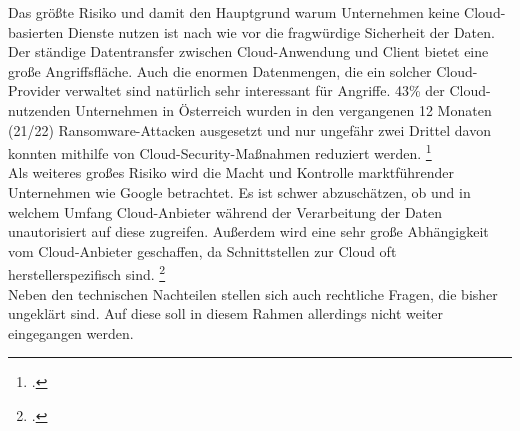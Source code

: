 Das größte Risiko und damit den Hauptgrund warum Unternehmen keine Cloud-basierten Dienste nutzen ist nach wie vor die fragwürdige Sicherheit der Daten. Der ständige Datentransfer zwischen Cloud-Anwendung und Client bietet eine große Angriffsfläche. Auch die enormen Datenmengen, die ein solcher Cloud-Provider verwaltet sind natürlich sehr interessant für Angriffe. 43\% der Cloud-nutzenden Unternehmen in Österreich wurden in den vergangenen 12 Monaten (21/22) Ransomware-Attacken ausgesetzt und nur ungefähr zwei Drittel davon konnten mithilfe von Cloud-Security-Maßnahmen reduziert werden. \footcite[Vgl.][S. 5]{KPMGAGWirtschaftsprufungsgesellschaft.25.06.2022} \\
Als weiteres großes Risiko wird die Macht und Kontrolle marktführender Unternehmen wie Google betrachtet. Es ist schwer abzuschätzen, ob und in welchem Umfang Cloud-Anbieter während der Verarbeitung der Daten unautorisiert auf diese zugreifen. Außerdem wird eine sehr große Abhängigkeit vom Cloud-Anbieter geschaffen, da Schnittstellen zur Cloud oft herstellerspezifisch sind. \footcite[Vgl.][]{o.V..2022} \\
Neben den technischen Nachteilen stellen sich auch rechtliche Fragen, die bisher ungeklärt sind. Auf diese soll in diesem Rahmen allerdings nicht weiter eingegangen werden. 


